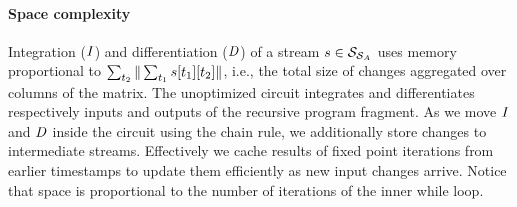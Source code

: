 \paragraph{Space complexity} Integration ($\mathit{I}$) and differentiation ($\mathit{D}$) of a
stream $s \in \mathcal{S}_{\mathcal{S}_{A}}$ uses memory proportional to
$\sum_{t_2}\| \sum_{t_1}s[t_1][t_2] \|$, i.e., the total size of changes
aggregated over columns of the matrix.  The unoptimized circuit integrates
and differentiates respectively inputs and outputs of the recursive program
fragment.  As we move $\mathit{I}$ and $\mathit{D}$ inside the circuit using the chain rule, we
additionally store changes to intermediate streams.  Effectively we cache results of 
fixed point iterations from earlier timestamps to update them efficiently as new input changes arrive.
Notice that space is proportional to the number of iterations of the inner while loop.

